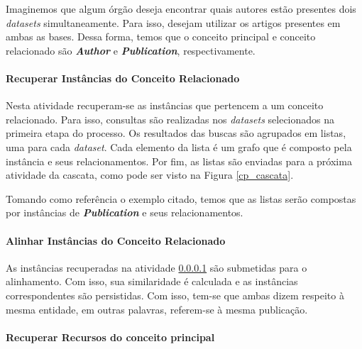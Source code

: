 Imaginemos que algum órgão deseja encontrar quais autores estão presentes dois \textit{datasets} simultaneamente. Para isso, desejam utilizar os artigos presentes em ambas as bases. Dessa forma, temos que o conceito principal e conceito relacionado são \textbf{\textit{Author}} e \textbf{\textit{Publication}}, respectivamente.

\paragraph{Recuperar Instâncias do Conceito Relacionado}
\label{recuperao_relacionado}
Nesta atividade recuperam-se as instâncias que pertencem a um conceito relacionado. Para isso, consultas são realizadas nos \textit{datasets} selecionados na primeira etapa do processo.  Os resultados das buscas são agrupados em listas, uma para cada \textit{dataset}. Cada elemento da lista é um grafo que é composto pela instância e seus relacionamentos. Por fim, as listas são enviadas para a próxima atividade da cascata, como pode ser visto na Figura \ref{cp_cascata}.

Tomando como referência o exemplo citado, temos que as listas serão compostas por instâncias de \textbf{\textit{Publication}} e seus relacionamentos.

\paragraph{Alinhar Instâncias do Conceito Relacionado}
\label{lista_rel}

As instâncias recuperadas na atividade \ref{recuperao_relacionado} são submetidas para o alinhamento. Com isso, sua similaridade é calculada e as instâncias correspondentes são persistidas. Com isso, tem-se que ambas dizem respeito à mesma entidade, em outras palavras, referem-se à mesma publicação.


\paragraph{Recuperar Recursos do conceito principal}
\label{recuperao_principal}


